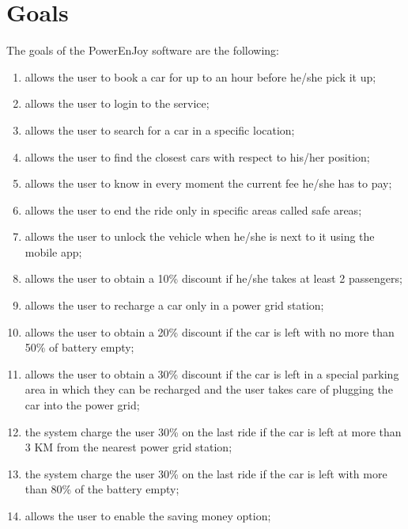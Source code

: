 \section{Goals}
The goals of the PowerEnJoy software are the following:
\begin{enumerate}
	\item allows the user to book a car for up to an hour before he/she pick it up;
	\item allows the user to login to the service;  
	\item allows the user to search for a car in a specific location; 
	\item allows the user to find the closest cars with respect to his/her position; 
	\item allows the user to know in every moment the current fee he/she has to pay;
	\item allows the user to end the ride only in specific areas called safe areas;
	\item allows the user to unlock the vehicle when he/she is next to it using the mobile app;
	\item allows the user to obtain a 10\% discount if he/she takes at least 2 passengers;
	\item allows the user to recharge a car only in a power grid station;
	\item allows the user to obtain a 20\% discount if the car is left with no more than 50\% of battery empty;
	\item allows the user to obtain a 30\% discount if the car is left in a special parking area in which they can be recharged and the user takes care of plugging the car into the power grid;
	\item the system charge the user 30\% on the last ride if the car is left at more than 3 KM from the nearest power grid station;
	\item the system charge the user 30\% on the last ride if the car is left with more than 80\% of the battery empty;
	\item allows the user to enable the saving money option;
	
	
\end{enumerate}